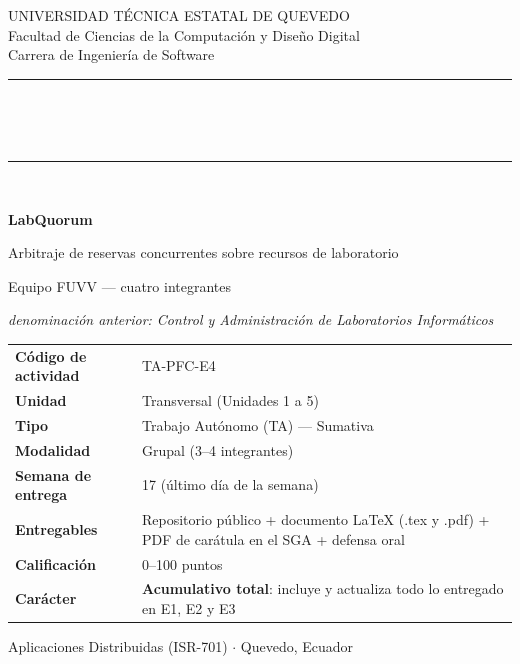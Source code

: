 \documentclass[11pt,a4paper]{article}
\begin{document}
	
	\begin{titlepage}
		\centering
		\vspace*{0.9cm}
		{\small\color{uteqGray} UNIVERSIDAD TÉCNICA ESTATAL DE QUEVEDO\\ Facultad de Ciencias de la Computación y Diseño Digital\\ Carrera de Ingeniería de Software\par}
		\vspace{16pt}
		{\color{uteqBlue}\rule{\textwidth}{2pt}}\\[8pt]
		\colorbox{uteqBlue}{\parbox{0.96\textwidth}{\centering{}\vspace{5pt}}}\\[8pt]
		{\color{uteqBlue}\rule{\textwidth}{2pt}}\\[18pt]
		{\LARGE\bfseries\color{uteqBlue} LabQuorum\par}
		\vspace{5pt}
		{\large\color{uteqGray} Arbitraje de reservas concurrentes sobre recursos de laboratorio\par}
		\vspace{4pt}
		{\normalsize\color{uteqGray} Equipo FUVV --- cuatro integrantes\par}
		\vspace{3pt}
		{\footnotesize\color{uteqGray}\emph{denominación anterior: Control y Administración de Laboratorios Informáticos}\par}
		\vspace{22pt}
		\begin{minipage}{0.92\textwidth}
			\small
			\begin{tabular}{@{}p{4.3cm}p{9.6cm}@{}}
				\toprule
				\textbf{Código de actividad} & TA-PFC-E4 \\
				\textbf{Unidad} & Transversal (Unidades 1 a 5) \\
				\textbf{Tipo} & Trabajo Autónomo (TA) --- Sumativa \\
				\textbf{Modalidad} & Grupal (3--4 integrantes) \\
				\textbf{Semana de entrega} & 17 (último día de la semana) \\
				\textbf{Entregables} & Repositorio público + documento LaTeX (.tex y .pdf) + PDF de carátula en el SGA + defensa oral \\
				\textbf{Calificación} & 0--100 puntos \\
				\textbf{Carácter} & \textbf{Acumulativo total}: incluye y actualiza todo lo entregado en E1, E2 y E3 \\
				\bottomrule
			\end{tabular}
		\end{minipage}
		\vfill
		{\small\color{uteqGray} Aplicaciones Distribuidas (ISR-701) $\cdot$ Quevedo, Ecuador\par}
	\end{titlepage}
	
\end{document}
